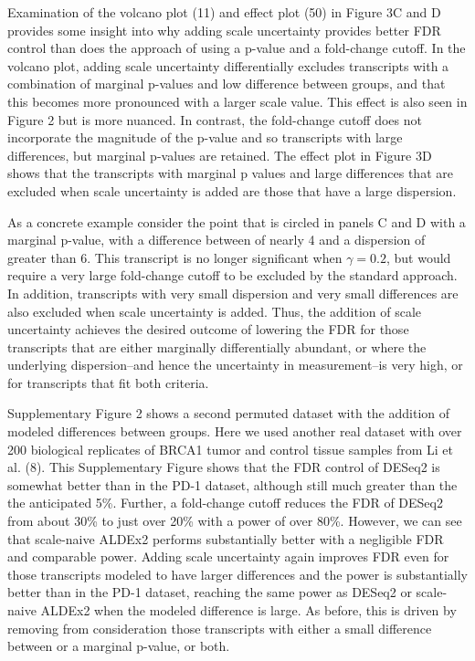 \documentclass[
]{article}
\begin{document}
Examination of the volcano plot (11) and effect plot (50) in Figure 3C
and D provides some insight into why adding scale uncertainty provides
better FDR control than does the approach of using a p-value and a
fold-change cutoff. In the volcano plot, adding scale uncertainty
differentially excludes transcripts with a combination of marginal
p-values and low difference between groups, and that this becomes more
pronounced with a larger scale value. This effect is also seen in Figure
2 but is more nuanced. In contrast, the fold-change cutoff does not
incorporate the magnitude of the p-value and so transcripts with large
differences, but marginal p-values are retained. The effect plot in
Figure 3D shows that the transcripts with marginal p values and large
differences that are excluded when scale uncertainty is added are those
that have a large dispersion.

As a concrete example consider the point that is circled in panels C and
D with a marginal p-value, with a difference between of nearly 4 and a
dispersion of greater than 6. This transcript is no longer significant
when \(\gamma = 0.2\), but would require a very large fold-change cutoff
to be excluded by the standard approach. In addition, transcripts with
very small dispersion and very small differences are also excluded when
scale uncertainty is added. Thus, the addition of scale uncertainty
achieves the desired outcome of lowering the FDR for those transcripts
that are either marginally differentially abundant, or where the
underlying dispersion--and hence the uncertainty in measurement--is very
high, or for transcripts that fit both criteria.

Supplementary Figure 2 shows a second permuted dataset with the addition
of modeled differences between groups. Here we used another real dataset
with over 200 biological replicates of BRCA1 tumor and control tissue
samples from Li et al. (8). This Supplementary Figure shows that the FDR
control of DESeq2 is somewhat better than in the PD-1 dataset, although
still much greater than the the anticipated 5\%. Further, a fold-change
cutoff reduces the FDR of DESeq2 from about 30\% to just over 20\% with
a power of over 80\%. However, we can see that scale-naive ALDEx2
performs substantially better with a negligible FDR and comparable
power. Adding scale uncertainty again improves FDR even for those
transcripts modeled to have larger differences and the power is
substantially better than in the PD-1 dataset, reaching the same power
as DESeq2 or scale-naive ALDEx2 when the modeled difference is large. As
before, this is driven by removing from consideration those transcripts
with either a small difference between or a marginal p-value, or both.
\end{document}
